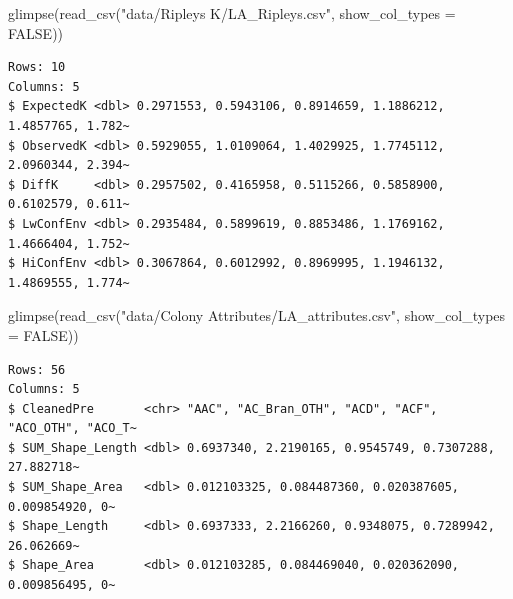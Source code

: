 \documentclass[
  letterpaper,
  DIV=11,
  numbers=noendperiod]{scrartcl}
\newenvironment{Shaded}{\begin{snugshade}}{\end{snugshade}}
\newcommand{\AttributeTok}[1]{\textcolor[rgb]{0.40,0.45,0.13}{#1}}
\newcommand{\ConstantTok}[1]{\textcolor[rgb]{0.56,0.35,0.01}{#1}}
\newcommand{\FunctionTok}[1]{\textcolor[rgb]{0.28,0.35,0.67}{#1}}
\newcommand{\NormalTok}[1]{\textcolor[rgb]{0.00,0.23,0.31}{#1}}
\newcommand{\StringTok}[1]{\textcolor[rgb]{0.13,0.47,0.30}{#1}}
\begin{document}
\begin{Shaded}
\begin{Highlighting}[]
\FunctionTok{glimpse}\NormalTok{(}\FunctionTok{read\_csv}\NormalTok{(}\StringTok{"data/Ripleys K/LA\_Ripley\textquotesingle{}s.csv"}\NormalTok{, }\AttributeTok{show\_col\_types =} \ConstantTok{FALSE}\NormalTok{))}
\end{Highlighting}
\end{Shaded}

\begin{verbatim}
Rows: 10
Columns: 5
$ ExpectedK <dbl> 0.2971553, 0.5943106, 0.8914659, 1.1886212, 1.4857765, 1.782~
$ ObservedK <dbl> 0.5929055, 1.0109064, 1.4029925, 1.7745112, 2.0960344, 2.394~
$ DiffK     <dbl> 0.2957502, 0.4165958, 0.5115266, 0.5858900, 0.6102579, 0.611~
$ LwConfEnv <dbl> 0.2935484, 0.5899619, 0.8853486, 1.1769162, 1.4666404, 1.752~
$ HiConfEnv <dbl> 0.3067864, 0.6012992, 0.8969995, 1.1946132, 1.4869555, 1.774~
\end{verbatim}

\begin{Shaded}
\begin{Highlighting}[]
\FunctionTok{glimpse}\NormalTok{(}\FunctionTok{read\_csv}\NormalTok{(}\StringTok{"data/Colony Attributes/LA\_attributes.csv"}\NormalTok{, }\AttributeTok{show\_col\_types =} \ConstantTok{FALSE}\NormalTok{))}
\end{Highlighting}
\end{Shaded}

\begin{verbatim}
Rows: 56
Columns: 5
$ CleanedPre       <chr> "AAC", "AC_Bran_OTH", "ACD", "ACF", "ACO_OTH", "ACO_T~
$ SUM_Shape_Length <dbl> 0.6937340, 2.2190165, 0.9545749, 0.7307288, 27.882718~
$ SUM_Shape_Area   <dbl> 0.012103325, 0.084487360, 0.020387605, 0.009854920, 0~
$ Shape_Length     <dbl> 0.6937333, 2.2166260, 0.9348075, 0.7289942, 26.062669~
$ Shape_Area       <dbl> 0.012103285, 0.084469040, 0.020362090, 0.009856495, 0~
\end{verbatim}
\end{document}

